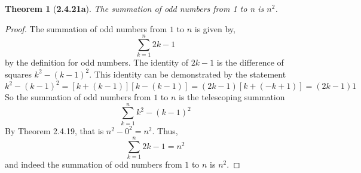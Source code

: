 \documentclass[a4paper, 12pt]{article}
\theoremstyle{plain}
\newtheorem*{theorem*}{Theorem}
\begin{document}
	
\begin{theorem*}[\textbf{2.4.21a}]
    The summation of odd numbers from 1 to n is $n^{2}$.
\end{theorem*}

\begin{proof}
    The summation of odd numbers from $1$ to $n$ is given by, $$\sum_{k=1}^{n} 2k - 1$$
    by the
    definition for odd numbers. The identity of $2k - 1$ is the difference of squares 
    $k^2 - (k-1)^2$. This identity can be demonstrated by the statement 
    $$k^2 - (k-1)^2 = [k + (k-1)][k - (k-1)] = (2k - 1)[k + (-k + 1)] = (2k-1)1$$ 
    So the summation of odd numbers from $1$ to $n$ is the telescoping summation
    $$\sum_{k=1}^{n} k^2 - (k-1)^2$$
    By Theorem 2.4.19, that is $n^2 - 0^2 = n^2$. Thus, 
    $$\sum_{k=1}^{n} 2k - 1 = n^2$$ 
    and indeed the summation of odd numbers from $1$ to $n$ is $n^2$.
\end{proof}
\end{document}
